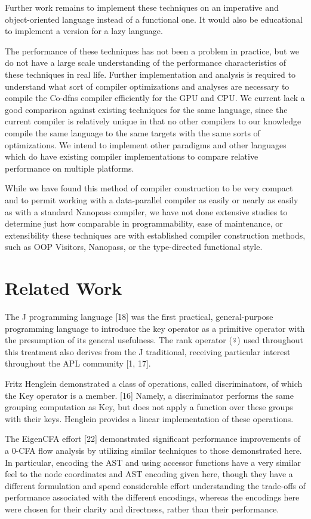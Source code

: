 \documentclass[numbers,preprint]{sigplanconf}
\begin{document}
Further work remains to implement these techniques on an imperative and 
object-oriented language instead of a functional one. It would also be 
educational to implement a version for a lazy language. 

The performance of these techniques has not been a problem in practice, but 
we do not have a large scale understanding of the performance characteristics 
of these techniques in real life. Further implementation and analysis is 
required to understand what sort of compiler optimizations and analyses are 
necessary to compile the Co-dfns compiler efficiently for the GPU and CPU. 
We current lack a good comparison against existing techniques for the same 
language, since the current compiler is relatively unique in that no other 
compilers to our knowledge compile the same language to the same targets 
with the same sorts of optimizations. We intend to implement other paradigms 
and other languages which do have existing compiler implementations to compare 
relative performance on multiple platforms. 

While we have found this method of compiler construction to be very compact 
and to permit working with a data-parallel compiler as easily or nearly as 
easily as with a standard Nanopass compiler, we have not done extensive 
studies to determine just how comparable in programmability, ease of 
maintenance, or extensibility these techniques are with established 
compiler construction methods, such as OOP Visitors, Nanopass, or the 
type-directed functional style.

\section{Related Work}

The J programming language [18] was the first practical,
general-purpose programming language to introduce the key operator as a
primitive operator with the presumption of its general usefulness. The
rank operator (⍤) used throughout this treatment also derives from
the J traditional, receiving particular interest throughout the APL
community [1, 17].

Fritz Henglein demonstrated a class of operations, called
discriminators, of which the Key operator is a member. [16] Namely,
a discriminator performs the same grouping computation as Key, but
does not apply a function over these groups with their keys. Henglein
provides a linear implementation of these operations.

The EigenCFA effort [22] demonstrated significant performance
improvements of a 0-CFA flow analysis by utilizing similar techniques
to those demonstrated here. In particular, encoding the AST and using
accessor functions have a very similar feel to the node coordinates and
AST encoding given here, though they have a different formulation and
spend considerable effort understanding the trade-offs of performance
associated with the different encodings, whereas the encodings here
were chosen for their clarity and directness, rather than their
performance.
\end{document}
